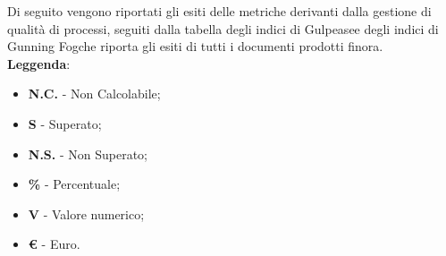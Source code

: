 Di seguito vengono riportati gli esiti delle metriche derivanti dalla gestione di qualità di processi, seguiti dalla tabella degli indici di Gulpease\glosp e degli indici di Gunning Fog\glosp che riporta gli esiti di tutti i documenti prodotti finora. \\
\textbf{Leggenda}:
\begin{itemize}
	\item \textbf{N.C.} - Non Calcolabile;
	\item \textbf{S} - Superato;
	\item \textbf{N.S.} - Non Superato;
	\item \textbf{\%} - Percentuale;
	\item \textbf{V} - Valore numerico;
	\item \textbf{\euro{}} - Euro.
\end{itemize}
